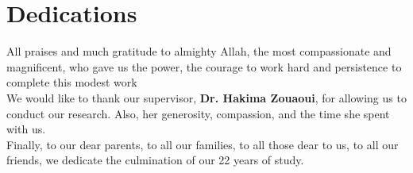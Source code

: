 \chapter*{\hfill Dedications \hfill}

\vspace{3cm}


All praises and much gratitude to almighty Allah, the most compassionate and magnificent, who gave us the power, the courage to work hard and
persistence to complete this modest work\\

We would like to thank our supervisor, \textbf{Dr. Hakima Zouaoui}, for
allowing us to conduct our research. Also, her generosity, compassion, and
the time she spent with us.\\

Finally, to our dear parents, to all our families, to all those dear to us, to all our friends,
we dedicate the culmination of our 22 years of study.